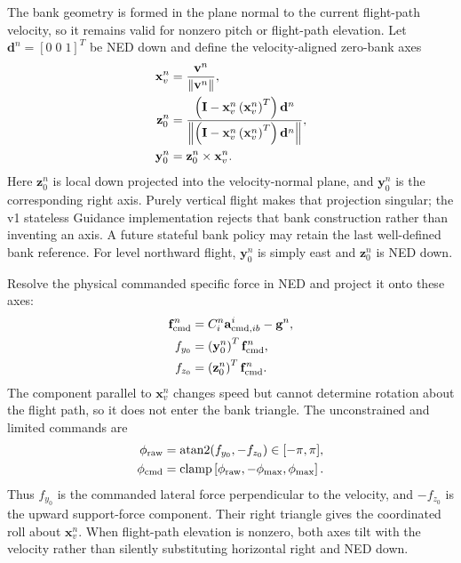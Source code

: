 The bank geometry is formed in the plane normal to the current flight-path
velocity, so it remains valid for nonzero pitch or flight-path elevation. Let
$\mathbf{d}^{n}=[0\;0\;1]^T$ be NED down and define the velocity-aligned
zero-bank axes
\begin{align}
\mathbf{x}_{v}^{n}
&=\frac{\mathbf{v}^{n}}{\left\lVert \mathbf{v}^{n} \right\rVert},\\
\mathbf{z}_{0}^{n}
&=
\frac{
\left(\mathbf{I}-\mathbf{x}_{v}^{n}\left(\mathbf{x}_{v}^{n}\right)^T\right)
\mathbf{d}^{n}
}{
\left\lVert 
\left(\mathbf{I}-\mathbf{x}_{v}^{n}\left(\mathbf{x}_{v}^{n}\right)^T\right)
\mathbf{d}^{n}
 \right\rVert
},\\
\mathbf{y}_{0}^{n}
&=\mathbf{z}_{0}^{n}\times\mathbf{x}_{v}^{n}.
\label{eq:bank_velocity_frame}
\end{align}
Here $\mathbf{z}_{0}^{n}$ is local down projected into the velocity-normal
plane, and $\mathbf{y}_{0}^{n}$ is the corresponding right axis. Purely
vertical flight makes that projection singular; the v1 stateless Guidance
implementation rejects that bank construction rather than inventing an axis.
A future stateful bank policy may retain the last well-defined bank reference. For level northward flight,
$\mathbf{y}_{0}^{n}$ is simply east and $\mathbf{z}_{0}^{n}$ is NED down.

Resolve the physical commanded specific force in NED and project it onto
these axes:
\begin{align}
\mathbf{f}_{\mathrm{cmd}}^{n}
&=C_i^n\mathbf{a}_{\mathrm{cmd},ib}^{i}-\mathbf{g}^{n},\\
f_{y_0}
&=\left(\mathbf{y}_{0}^{n}\right)^T\mathbf{f}_{\mathrm{cmd}}^{n},\\
f_{z_0}
&=\left(\mathbf{z}_{0}^{n}\right)^T\mathbf{f}_{\mathrm{cmd}}^{n}.
\label{eq:bank_force_components}
\end{align}
The component parallel to $\mathbf{x}_{v}^{n}$ changes speed but cannot
determine rotation about the flight path, so it does not enter the bank
triangle. The unconstrained and limited commands are
\begin{align}
\phi_{\mathrm{raw}}
&=\operatorname{atan2}\!\left(f_{y_0},-f_{z_0}\right)
\in[-\pi,\pi],\\
\phi_{\mathrm{cmd}}
&=
\operatorname{clamp}\left[
\phi_{\mathrm{raw}},
-\phi_{\max},
\phi_{\max}
\right].
\label{eq:bank_from_ned_acceleration}
\end{align}
Thus $f_{y_0}$ is the commanded lateral force perpendicular to the velocity,
and $-f_{z_0}$ is the upward support-force component. Their right triangle
gives the coordinated roll about $\mathbf{x}_{v}^{n}$. When flight-path
elevation is nonzero, both axes tilt with the velocity rather than silently
substituting horizontal right and NED down.

